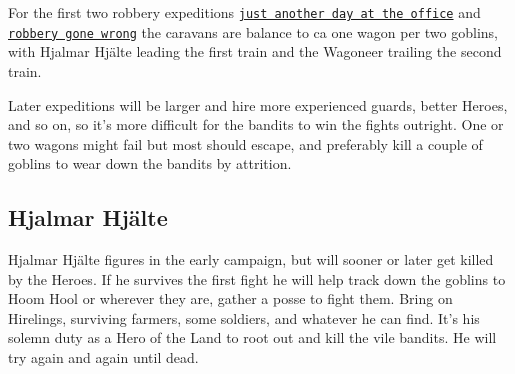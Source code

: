 For the first two robbery expeditions 
\hyperref[00justanotherdayattheoffice]{\texttt{just another day at the office}} and 
\hyperref[01robberygonewrong]{\texttt{robbery gone wrong}}
the caravans are balance to ca one wagon per two goblins, with Hjalmar Hjälte leading the first train and the Wagoneer trailing the second train.

Later expeditions will be larger and hire more experienced guards, better Heroes, and so on, so it's more difficult for the bandits to win the fights outright. One or two wagons might fail but most should escape, and preferably kill a couple of goblins to wear down the bandits by attrition.


\subsection*{Hjalmar Hjälte}
\label{hjalmarhjalte}

Hjalmar Hjälte figures in the early campaign, but will sooner or later get killed by the Heroes. If he survives the first fight he will help track down the goblins to Hoom Hool or wherever they are, gather a posse to fight them. Bring on Hirelings, surviving farmers, some soldiers, and whatever he can find. It's his solemn duty as a Hero of the Land to root out and kill the vile bandits. He will try again and again until dead.

\

